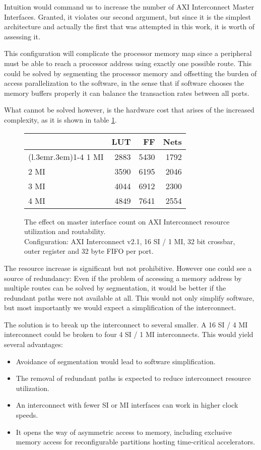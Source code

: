 Intuition would command us to increase the number of AXI Interconnect
Master Interfaces. Granted, it violates our second argument, but since
it is the simplest architecture and actually the first that was attempted
in this work, it is worth of assessing it.

This configuration will complicate the processor memory map
since a peripheral must be able to reach a processor address using
exactly one possible route. 
This could be solved by segmenting the processor memory
and offsetting the burden of access parallelization to the software,
in the sense that if software chooses the memory buffers properly
it can balance the \gls{transaction} rates between all ports.

What cannot be solved however, is the hardware cost that arises of the increased
complexity, as it is shown in table \ref{tab:int-mmi}.

\begin{figure}[ht!]
\centering
\begin{tabular}{lrrr}
\toprule
	& LUT	& FF	& Nets \\
\cmidrule(l{.3em}r{.3em}){1-4}
1 MI	& 2883	& 5430	& 1792	\\
2 MI	& 3590	& 6195	& 2046	\\
3 MI	& 4044	& 6912	& 2300	\\
4 MI	& 4849	& 7641	& 2554	\\
\bottomrule
\end{tabular}
\caption{The effect on master interface count on AXI Interconnect resource utilization and routability.\\
	Configuration: AXI Interconnect v2.1, 16 SI / 1 MI, 32 bit crossbar, 
	outer register and 32 byte FIFO per port.}
\label{tab:int-mmi}
\end{figure}

The resource increase is significant but not prohibitive. 
However one could see a source of redundancy: Even if the problem
of accessing a memory address by multiple routes can be solved by segmentation,
it would be better if the redundant paths were not available at all.
This would not only simplify software, but most importantly we would expect
a simplification of the interconnect.

The solution is to break up the interconnect to several smaller. 
A 16 SI / 4 MI interconnect could be
broken to four 4 SI / 1 MI interconnects. 
This would yield several advantages:
\begin{itemize}
\item	Avoidance of segmentation would lead to software simplification.
\item	The removal of redundant paths is expected to reduce interconnect resource utilization.
\item	An interconnect with fewer SI or MI interfaces can work in higher clock speeds.
\item	It opens the way of asymmetric access to memory, including exclusive memory access
	for reconfigurable partitions hosting time-critical accelerators.
\end{itemize}
 
